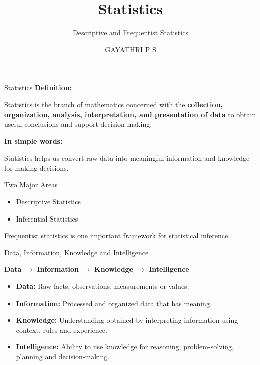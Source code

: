 \documentclass[aspectratio=169]{beamer}
\title{Statistics}
\subtitle{Descriptive and Frequentist Statistics}
\author{GAYATHRI P S}
\begin{document}
\begin{frame}
\titlepage
\end{frame}

\begin{frame}{Statistics}
\textbf{Definition:}

Statistics is the branch of mathematics concerned with the
\textbf{collection, organization, analysis, interpretation, and
presentation of data} to obtain useful conclusions and support
decision-making.

\vspace{0.4cm}

\textbf{In simple words:}

Statistics helps us convert raw data into meaningful information
and knowledge for making decisions.

\vspace{0.4cm}

\begin{block}{Two Major Areas}
\begin{itemize}
    \item Descriptive Statistics
    \item Inferential Statistics
\end{itemize}
\end{block}

Frequentist statistics is one important framework for statistical
inference.
\end{frame}

\begin{frame}{Data, Information, Knowledge and Intelligence}

\begin{center}
\Large
\textbf{Data}
$\rightarrow$
\textbf{Information}
$\rightarrow$
\textbf{Knowledge}
$\rightarrow$
\textbf{Intelligence}
\end{center}

\vspace{0.5cm}

\begin{itemize}
    \item \textbf{Data:} Raw facts, observations, measurements or values.
    \item \textbf{Information:} Processed and organized data that has meaning.
    \item \textbf{Knowledge:} Understanding obtained by interpreting information using context, rules and experience.
    \item \textbf{Intelligence:} Ability to use knowledge for reasoning, problem-solving, planning and decision-making.
\end{itemize}
\end{frame}
\end{document}
